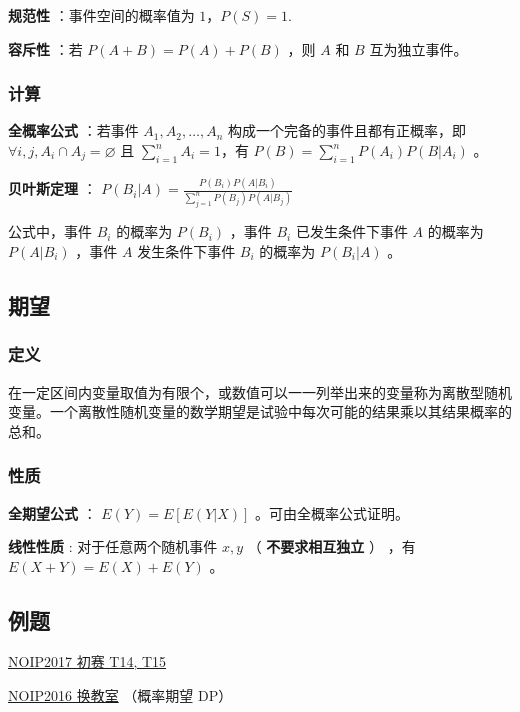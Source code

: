 \textbf{ 规范性 } ：事件空间的概率值为 $1$，$P(S)=1$.

\textbf{ 容斥性 } ：若 $P(A+B) = P(A)+P(B)$ ，则  $A$ 和 $B$ 互为独立事件。

\subsubsection{计算}

\textbf{ 全概率公式 } ：若事件 $A_1,A_2,\ldots,A_n$ 构成一个完备的事件且都有正概率，即 $\forall i,j, A_i\cap A_j=\varnothing$ 且 $\displaystyle \sum_{i=1}^n A_i=1$，有 $\displaystyle P(B)=\sum_{i=1}^n P(A_i)P(B|A_i)$ 。

\textbf{ 贝叶斯定理 } ： $\displaystyle P(B_i|A)=\frac{P(B_i)P(A|B_i)}{\displaystyle \sum_{j=1}^n P(B_j)P(A|B_j)}$

公式中，事件 $B_i$ 的概率为 $P(B_i)$ ，事件 $B_i$ 已发生条件下事件 $A$ 的概率为 $P(A|B_i)$ ，事件 $A$ 发生条件下事件 $B_i$ 的概率为 $P(B_i|A)$ 。

\subsection{期望}

\subsubsection{定义}

在一定区间内变量取值为有限个，或数值可以一一列举出来的变量称为离散型随机变量。一个离散性随机变量的数学期望是试验中每次可能的结果乘以其结果概率的总和。

\subsubsection{性质}

\textbf{ 全期望公式 } ： $E(Y)=E[E(Y|X)]$ 。可由全概率公式证明。

\textbf{ 线性性质 } : 对于任意两个随机事件 $x,y$ （ \textbf{ 不要求相互独立 } ） ，有 $E(X+Y)=E(X)+E(Y)$ 。

\subsection{例题}

\href{https://ti.luogu.com.cn/problemset/1022}{NOIP2017 初赛 T14, T15}

\href{https://www.luogu.org/problemnew/show/P1850}{NOIP2016 换教室} （概率期望 DP）
